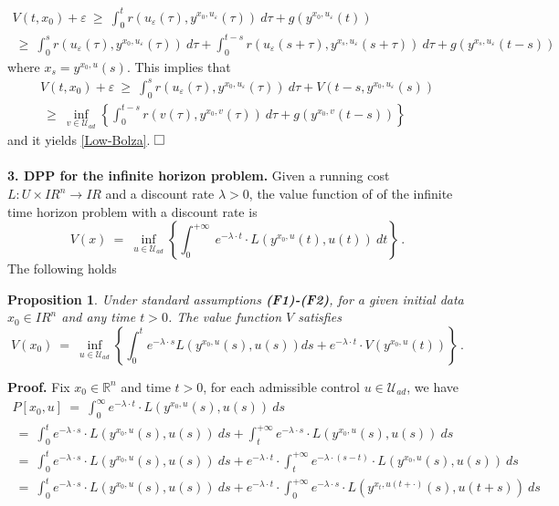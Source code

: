 \documentclass[letterpaper,12pt]{article}
\numberwithin{equation}{section}
\newcommand{\qed}{\hfill$\square$\vspace{0.3truecm}}
\newcommand{\R}{\mathbb{R}}
\def\ve{\varepsilon}
\def\R{I\!\!R}
\def\sqr#1#2{\vbox{\hrule height .#2pt
\hbox{\vrule width .#2pt height #1pt \kern #1pt
\vrule width .#2pt}\hrule height .#2pt }}
\def\square{\sqr74}
\newtheorem{proposition}{Proposition}[theorem]
\begin{document}
\begin{multline*}
V(t,x_0)+\ve~\geq~\int_{0}^tr(u_{\ve}(\tau),y^{x_0,u_{\ve}}(\tau))~d\tau+g(y^{x_0,u_{\ve}}(t))\\
~\geq~\int_{0}^sr(u_{\ve}(\tau),y^{x_0,u_{\ve}}(\tau))~d\tau+\int_{0}^{t-s}r(u_{\ve}(s+\tau),y^{x_s,u_{\ve}}(s+\tau))~d\tau+g(y^{x_s,u_{\ve}}(t-s))
\end{multline*}
where $x_s=y^{x_0,u}(s)$. This implies that 
\begin{multline*}
V(t,x_0)+\ve~\geq~\int_{0}^sr(u_{\ve}(\tau),y^{x_0,u_{\ve}}(\tau))~d\tau+V(t-s,y^{x_0,u_{\ve}}(s))\\
~\geq~\inf_{v\in\mathcal{U}_{ad}}\left\{\int_{0}^{t-s}r(v(\tau),y^{x_0,v}(\tau))~d\tau+g(y^{x_0,v}(t-s))\right\}
\end{multline*}
and it yields \ref{Low-Bolza}.
\qed
\quad\\
\quad\\
{\bf 3. DPP for the infinite horizon problem.} Given a running cost $L:U\times\R^n\to\R$ and a discount rate $\lambda>0$, the value function of of the infinite time horizon problem with a discount rate is 
$$
V(x)~=~\inf_{u\in\mathcal{U}_{ad}}\left\{\int_{0}^{+\infty}~e^{-\lambda\cdot t}\cdot L(y^{x_0,u}(t),u(t))~dt\right\}\,.
$$
The following holds
\begin{proposition} Under standard assumptions {\bf (F1)-(F2)}, for a given initial data $x_0\in\R^n$ and any time $t>0$. The value function $V$ satisfies
\begin{equation}
V(x_0)~=~\inf_{u\in\mathcal{U}_{ad}}\left\{\int_{0}^te^{-\lambda\cdot s}L(y^{x_0,u}(s),u(s))ds+e^{-\lambda\cdot t}\cdot V(y^{x_0,u}(t))\right\}\,.
\end{equation}
\end{proposition}
{\bf Proof.} Fix $x_0\in\mathbb{R}^n$ and time $t>0$, for each admissible control $u\in\mathcal{U}_{ad}$, we have 
\begin{multline*}
P[x_0,u]~=~\int_{0}^{\infty}e^{-\lambda\cdot t}\cdot L(y^{x_0,u}(s),u(s))~ds
\\
~=~\int_{0}^te^{-\lambda\cdot s}\cdot L(y^{x_0,u}(s),u(s))~ds+\int_{t}^{+\infty}e^{-\lambda\cdot s}\cdot L(y^{x_0,u}(s),u(s))~ds
\\
~=~\int_{0}^te^{-\lambda\cdot s}\cdot L(y^{x_0,u}(s),u(s))~ds+e^{-\lambda\cdot t}\cdot \int_{t}^{+\infty}e^{-\lambda\cdot (s-t)}\cdot L(y^{x_0,u}(s),u(s))~ds\\
~=~\int_{0}^te^{-\lambda\cdot s}\cdot L(y^{x_0,u}(s),u(s))~ds+e^{-\lambda\cdot t}\cdot \int_{0}^{+\infty}e^{-\lambda\cdot s}\cdot L(y^{x_t,u(t+\cdot)}(s),u(t+s))~ds
\end{multline*}
\end{document}
